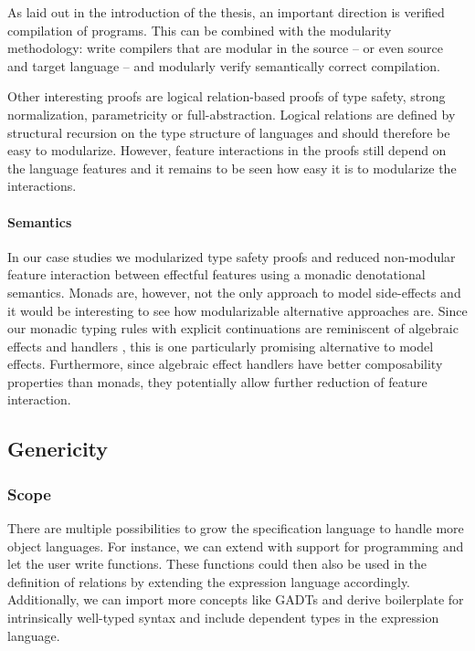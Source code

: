 As laid out in the introduction of the thesis, an important direction is
verified compilation of programs. This can be combined with the modularity
methodology: write compilers that are modular in the source -- or even source
and target language -- and modularly verify semantically correct compilation.

Other interesting proofs are logical relation-based proofs of type safety,
strong normalization, parametricity or full-abstraction. Logical relations are
defined by structural recursion on the type structure of languages and should
therefore be easy to modularize. However, feature interactions in the proofs
still depend on the language features and it remains to be seen how easy it is
to modularize the interactions.

\paragraph{Semantics}
In our case studies we modularized type safety proofs and reduced non-modular
feature interaction between effectful features using a monadic denotational
semantics. Monads are, however, not the only approach to model side-effects and
it would be interesting to see how modularizable alternative approaches are.
Since our monadic typing rules with explicit continuations are reminiscent of
algebraic effects and handlers \cite{eff,handlers,hia}, this is one particularly
promising alternative to model effects. Furthermore, since algebraic effect
handlers have better composability properties than monads, they potentially
allow further reduction of feature interaction.


\subsection{Genericity}


\subsubsection{Scope}
There are multiple possibilities to grow the \Knot specification language to
handle more object languages. For instance, we can extend \Knot with support for
programming and let the user write functions. These functions could then also be
used in the definition of relations by extending the expression language
accordingly. Additionally, we can import more concepts like GADTs and derive
boilerplate for intrinsically well-typed syntax and include dependent types in
the expression language.

